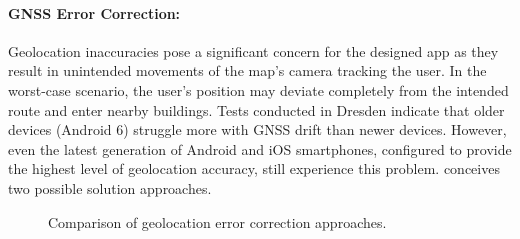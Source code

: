 \paragraph{GNSS Error Correction:} Geolocation inaccuracies pose a significant concern for the designed app as they result in unintended movements of the map's camera tracking the user. In the worst-case scenario, the user's position may deviate completely from the intended route and enter nearby buildings. Tests conducted in Dresden indicate that older devices (Android 6) struggle more with GNSS drift than newer devices. However, even the latest generation of Android and iOS smartphones, configured to provide the highest level of geolocation accuracy, still experience this problem.  conceives two possible solution approaches.

\begin{figure}[htbp]
\centering
{}
\caption{Comparison of geolocation error correction approaches.}
\label{fig:battery-efficient-gps-error-correction}
\end{figure}

